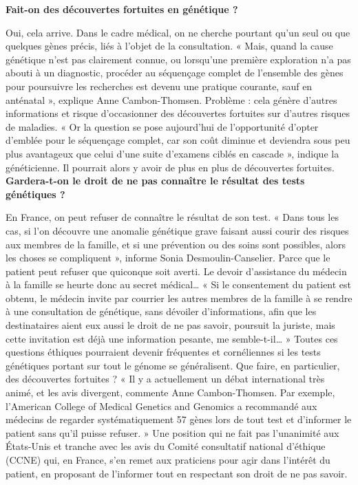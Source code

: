\documentclass[8pt]{article}
\begin{document}
\textbf{Fait-on des découvertes fortuites en génétique ?}

Oui, cela arrive. Dans le cadre médical, on ne cherche pourtant qu’un seul ou que quelques gènes précis, liés à l’objet de la consultation. « Mais, quand la cause génétique n’est pas clairement connue, ou lorsqu’une première exploration n’a pas abouti à un diagnostic, procéder au séquençage complet de l’ensemble des gènes pour poursuivre les recherches est devenu une pratique courante, sauf en anténatal », explique Anne Cambon-Thomsen. Problème : cela génère d’autres informations et risque d’occasionner des découvertes fortuites sur d’autres risques de maladies. « Or la question se pose aujourd’hui de l’opportunité d’opter d’emblée pour le séquençage complet, car son coût diminue et deviendra sous peu plus avantageux que celui d’une suite d’examens ciblés en cascade », indique la généticienne. Il pourrait alors y avoir de plus en plus de découvertes fortuites.  \\
 
 
\textbf{Gardera-t-on le droit de ne pas connaître le résultat des tests génétiques ?}

En France, on peut refuser de connaître le résultat de son test. « Dans tous les cas, si l’on découvre une anomalie génétique grave faisant aussi courir des risques aux membres de la famille, et si une prévention ou des soins sont possibles, alors les choses se compliquent », informe Sonia Desmoulin-Canselier. Parce que le patient peut refuser que quiconque soit averti. Le devoir d’assistance du médecin à la famille se heurte donc au secret médical… « Si le consentement du patient est obtenu, le médecin invite par courrier les autres membres de la famille à se rendre à une consultation de génétique, sans dévoiler d’informations, afin que les destinataires aient eux aussi le droit de ne pas savoir, poursuit la juriste, mais cette invitation est déjà une information pesante, me semble-t-il… » Toutes ces questions éthiques pourraient devenir fréquentes et cornéliennes si les tests génétiques portant sur tout le génome se généralisent. Que faire, en particulier, des découvertes fortuites ? « Il y a actuellement un débat international très animé, et les avis divergent, commente Anne Cambon-Thomsen. Par exemple, l’American College of Medical Genetics and Genomics a recommandé aux médecins de regarder systématiquement 57 gènes lors de tout test et d’informer le patient sans qu’il puisse refuser. » Une position qui ne fait pas l’unanimité aux États-Unis et tranche avec les avis du Comité consultatif national d’éthique (CCNE) qui, en France, s’en remet aux praticiens pour agir dans l’intérêt du patient, en proposant de l’informer tout en respectant son droit de ne pas savoir.  \\
 
\end{document}
